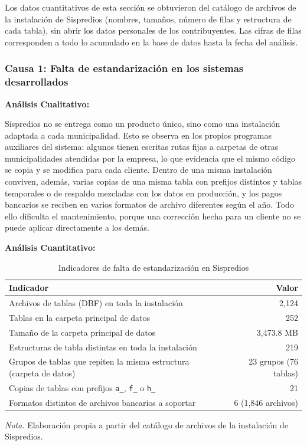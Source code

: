\documentclass[12pt,a4paper]{report}
\begin{document}
Los datos cuantitativos de esta sección se obtuvieron del catálogo de archivos de la instalación de Sispredios (nombres, tamaños, número de filas y estructura de cada tabla), sin abrir los datos personales de los contribuyentes. Las cifras de filas corresponden a todo lo acumulado en la base de datos hasta la fecha del análisis.

\subsubsection*{Causa 1: Falta de estandarización en los sistemas desarrollados}

\textbf{Análisis Cualitativo:}

Sispredios no se entrega como un producto único, sino como una instalación adaptada a cada municipalidad. Esto se observa en los propios programas auxiliares del sistema: algunos tienen escritas rutas fijas a carpetas de otras municipalidades atendidas por la empresa, lo que evidencia que el mismo código se copia y se modifica para cada cliente. Dentro de una misma instalación conviven, además, varias copias de una misma tabla con prefijos distintos y tablas temporales o de respaldo mezcladas con los datos en producción, y los pagos bancarios se reciben en varios formatos de archivo diferentes según el año. Todo ello dificulta el mantenimiento, porque una corrección hecha para un cliente no se puede aplicar directamente a los demás.

\textbf{Análisis Cuantitativo:}

\begin{table}[H]
\centering
\caption{Indicadores de falta de estandarización en Sispredios}
\label{tab:causa1}
\begin{tabular}{p{9.5cm}r}
\toprule
\textbf{Indicador} & \textbf{Valor} \\
\midrule
Archivos de tablas (DBF) en toda la instalación & 2,124 \\
Tablas en la carpeta principal de datos & 252 \\
Tamaño de la carpeta principal de datos & 3,473.8 MB \\
Estructuras de tabla distintas en toda la instalación & 219 \\
Grupos de tablas que repiten la misma estructura (carpeta de datos) & 23 grupos (76 tablas) \\
Copias de tablas con prefijos \texttt{a\_}, \texttt{f\_} o \texttt{h\_} & 21 \\
Formatos distintos de archivos bancarios a soportar & 6 (1,846 archivos) \\
\bottomrule
\end{tabular}

\vspace{0.3cm}
\footnotesize\textit{Nota.} Elaboración propia a partir del catálogo de archivos de la instalación de Sispredios.
\end{table}
\end{document}

